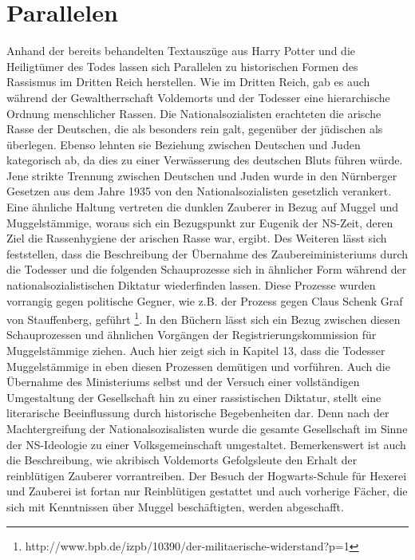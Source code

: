 \section {Parallelen}
Anhand der bereits behandelten Textauszüge aus \glqq Harry Potter und die Heiligtümer des Todes\grqq{} lassen sich Parallelen zu historischen Formen des Rassismus im Dritten Reich herstellen.
Wie im Dritten Reich, gab es auch während der Gewaltherrschaft Voldemorts und der Todesser eine hierarchische Ordnung menschlicher \glqq Rassen\grqq. 
Die Nationalsozialisten erachteten die \glqq arische\grqq{} Rasse der Deutschen, die als besonders rein galt, gegenüber der \glqq jüdischen\grqq{} als überlegen. 
Ebenso lehnten sie Beziehung zwischen Deutschen und Juden kategorisch ab, da dies zu einer Verwässerung des \glqq deutschen\grqq{} Bluts führen würde.
Jene strikte Trennung zwischen Deutschen und Juden wurde in den \glqq Nürnberger Gesetzen\grqq{} aus dem Jahre 1935 von den Nationalsozialisten gesetzlich verankert\cite[S.72]{MW121}.
Eine ähnliche Haltung vertreten die dunklen Zauberer in Bezug auf Muggel und Muggelstämmige, woraus sich ein Bezugspunkt zur Eugenik der NS-Zeit, deren Ziel die \glqq Rassenhygiene\grqq{} der \glqq arischen\grqq{} Rasse war, ergibt.
Des Weiteren lässt sich feststellen, dass die Beschreibung der Übernahme des Zaubereiministeriums durch die Todesser und die folgenden \glqq Schauprozesse\grqq{} sich in ähnlicher Form während der nationalsozialistischen Diktatur wiederfinden lassen.
Diese Prozesse wurden vorrangig gegen politische Gegner, wie z.B. der Prozess gegen Claus Schenk Graf von Stauffenberg, geführt \footnote{http://www.bpb.de/izpb/10390/der-militaerische-widerstand?p=1}. 
In den Büchern lässt sich ein Bezug zwischen diesen Schauprozessen und ähnlichen Vorgängen der \glqq Registrierungskommission für Muggelstämmige\grqq{} ziehen. 
Auch hier zeigt sich in Kapitel 13, dass die Todesser Muggelstämmige in eben diesen Prozessen demütigen und vorführen.
Auch die Übernahme des Ministeriums selbst und der Versuch einer  vollständigen Umgestaltung der Gesellschaft hin zu einer rassistischen Diktatur, stellt eine literarische Beeinflussung durch historische Begebenheiten dar.
Denn nach der \glqq Machtergreifung\grqq{} der Nationalsozisalisten wurde die gesamte Gesellschaft im Sinne der NS-Ideologie zu einer \glqq Volksgemeinschaft\grqq{} umgestaltet. 
Bemerkenswert ist auch die Beschreibung, wie akribisch Voldemorts Gefolgsleute den \glqq Erhalt\grqq{} der reinblütigen Zauberer vorrantreiben.
Der Besuch der Hogwarts-Schule für Hexerei und Zauberei ist fortan nur Reinblütigen gestattet und auch vorherige Fächer, die sich mit Kenntnissen über Muggel beschäftigten, werden abgeschafft. 
